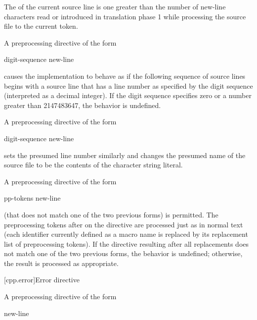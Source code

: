 \pnum
The
of the current source line is one greater than
the number of new-line characters read or introduced
in translation phase 1
while processing the source file to the current token.

\pnum
A preprocessing directive of the form

\begin{ncsimplebnf}
 digit-sequence new-line
\end{ncsimplebnf}

causes the implementation to behave as if
the following sequence of source lines begins with a
source line that has a line number as specified
by the digit sequence (interpreted as a decimal integer).
If the digit sequence specifies zero
or a number greater than 2147483647,
the behavior is undefined.

\pnum
A preprocessing directive of the form

\begin{ncsimplebnf}
 digit-sequence    new-line
\end{ncsimplebnf}

sets the presumed line number similarly and changes the
presumed name of the source file to be the contents
of the character string literal.

\pnum
A preprocessing directive of the form

\begin{ncsimplebnf}
 pp-tokens new-line
\end{ncsimplebnf}

(that does not match one of the two previous forms)
is permitted.
The preprocessing tokens after
on the directive are processed just as in normal text
(each identifier currently defined as a macro name is replaced by its
replacement list of preprocessing tokens).
If the directive resulting after all replacements does not match
one of the two previous forms, the behavior is undefined;
otherwise, the result is processed as appropriate.

[cpp.error]{Error directive}%
%

\pnum
A preprocessing directive of the form

\begin{ncsimplebnf}
  new-line
\end{ncsimplebnf}

